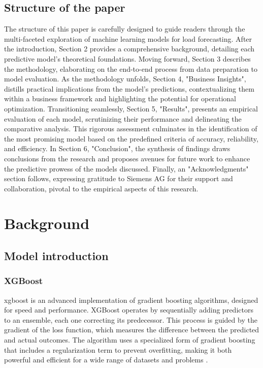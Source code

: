 \documentclass{article} %
\begin{document}
\subsection{Structure of the paper}
The structure of this paper is carefully designed to guide readers through the multi-faceted exploration of machine learning models for load forecasting. After the introduction, Section 2 provides a comprehensive background, detailing each predictive model's theoretical foundations. Moving forward, Section 3 describes the methodology, elaborating on the end-to-end process from data preparation to model evaluation. As the methodology unfolds, Section 4, "Business Insights", distills practical implications from the model's predictions, contextualizing them within a business framework and highlighting the potential for operational optimization. Transitioning seamlessly, Section 5, "Results", presents an empirical evaluation of each model, scrutinizing their performance and delineating the comparative analysis. This rigorous assessment culminates in the identification of the most promising model based on the predefined criteria of accuracy, reliability, and efficiency.
In Section 6, "Conclusion", the synthesis of findings draws conclusions from the research and proposes avenues for future work to enhance the predictive prowess of the models discussed. Finally, an "Acknowledgments" section follows, expressing gratitude to Siemens AG for their support and collaboration, pivotal to the empirical aspects of this research.

\section{Background}
\subsection{Model introduction}
\subsubsection{XGBoost}     
\gls*{xgboost} is an advanced implementation of gradient boosting algorithms, designed for speed and performance. 
XGBoost operates by sequentially adding predictors to an ensemble, each one correcting its predecessor. This process is guided by the gradient of the loss function, which measures the difference between the predicted and actual outcomes. The algorithm uses a specialized form of gradient boosting that includes a regularization term to prevent overfitting, making it both powerful and efficient for a wide range of datasets and problems  \cite{chen2015xgboost}.
\end{document}
